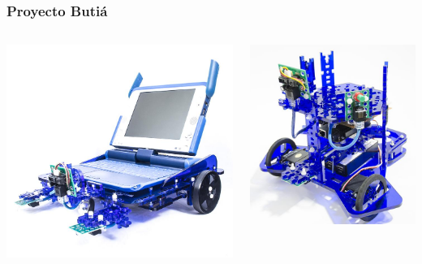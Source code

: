 \documentclass[spanish]{beamer}
\begin{document}
\begin{frame}
\frametitle{Proyecto Butiá}
  \begin{columns}[T]
    \begin{column}{.33\textwidth}
    \includegraphics[width=\textwidth]{butia2.png}
    \end{column}
    \begin{column}{.33\textwidth}
    \includegraphics[width=\textwidth]{butia3.png}

\end{column}
\end{columns}
\end{frame}
\end{document}
